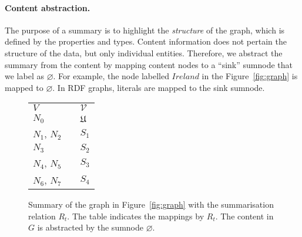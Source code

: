 \paragraph{Content abstraction.}

The purpose of a summary is to highlight the \emph{structure} of the graph, which is defined by the properties and types. Content information does not pertain the structure of the data, but only individual entities. Therefore, we abstract the summary from the content by mapping content nodes to a ``sink'' sumnode that we label as $\varnothing$. For example, the node labelled $Ireland$ in the Figure~\ref{fig:graph} is mapped to $\varnothing$. In RDF graphs, literals are mapped to the sink sumnode.

\begin{figure}
	\centering
	\begin{minipage}{.7\textwidth}
		\resizebox{\textwidth}{!}{
			
		}
	\end{minipage}
	\quad
	\begin{minipage}[h]{.25\textwidth}
		\centering
		\caption*{$R_t\left(V, \mathcal{V}\right)$}
		\begin{tabular}{lc@{\hs}l}
			\toprule
			$V$ & \phantom{a} & $\mathcal{V}$ \\
			\cmidrule{1-1} \cmidrule{3-3}
			$N_0$ & \phantom{a} & $\mathfrak{U}$ \\
			$N_1$, $N_2$ & \phantom{a} & $S_1$ \\
			$N_3$ & \phantom{a} & $S_2$ \\
			$N_4$, $N_5$ & \phantom{a} & $S_3$ \\
			$N_6$, $N_7$ & \phantom{a} & $S_4$ \\
			\bottomrule
		\end{tabular}
	\end{minipage}
	\caption{Summary of the graph in Figure~\ref{fig:graph} with the summarisation relation $R_t$. The table indicates the mappings by $R_t$. The content in $G$ is abstracted by the sumnode $\varnothing$.}
	\label{fig:classes-summary}
\end{figure}

